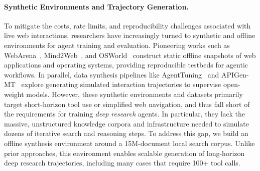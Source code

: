 \paragraph{Synthetic Environments and Trajectory Generation.}
To mitigate the costs, rate limits, and reproducibility challenges associated with live web interactions, researchers have increasingly turned to synthetic and offline environments for agent training and evaluation. Pioneering works such as WebArena~\citep{zhou2023webarena}, Mind2Web~\citep{deng2023mind2web}, and OSWorld~\citep{xie2024osworld} construct static offline snapshots of web applications and operating systems, providing reproducible testbeds for agentic workflows. In parallel, data synthesis pipelines like AgentTuning~\citep{zeng2024agenttuning} and APIGen-MT~\citep{prabhakar2025apigen} explore generating simulated interaction trajectories to supervise open-weight models. However, these synthetic environments and datasets primarily target short-horizon tool use or simplified web navigation, and thus fall short of the requirements for training \textit{deep research} agents. In particular, they lack the massive, unstructured knowledge corpora and infrastructure needed to simulate dozens of iterative search and reasoning steps. To address this gap, we build an offline synthesis environment around a 15M-document local search corpus. Unlike prior approaches, this environment enables scalable generation of long-horizon deep research trajectories, including many cases that require 100+ tool calls.